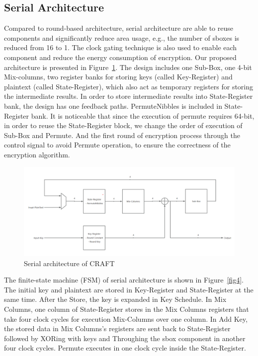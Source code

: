 \documentclass[sn-basic]{sn-jnl}%
\begin{document}
\subsection{Serial Architecture}\label{subsec2}
Compared to round-based architecture, serial architecture are able to reuse components and significantly reduce area usage, e.g., the number of sboxes is reduced from 16 to 1. The clock gating technique is also used to enable each component and reduce the energy consumption of encryption. Our proposed architecture is presented in Figure~\ref{fig3}. The design includes one Sub-Box, one 4-bit Mix-columns, two register banks for storing keys (called Key-Register) and plaintext (called State-Register), which also act as temporary registers for storing the intermediate results. In order to store intermediate results into State-Register bank, the design has one feedback paths. PermuteNibbles is included in State-Register bank. It is noticeable that since the execution of permute requires 64-bit, in order to reuse the State-Register block, we change the order of execution of Sub-Box and Permute. And the first round of encryption process through the control signal to avoid Permute operation, to ensure the correctness of the encryption algorithm.

\begin{figure}[h]%
    \caption{Serial architecture of CRAFT}\label{fig3}
    \centering
    \includegraphics[width=\textwidth]{serial_design.png}
\end{figure}

The finite-state machine (FSM) of serial architecture is shown in Figure~\ref{fig4}. The initial key and plaintext are stored in Key-Register and State-Register at the same time. After the Store, the key is expanded in Key Schedule. In Mix Columns, one column of State-Register stores in the Mix Columns registers that take four clock cycles for execution Mix-Columns over one column. In Add Key, the stored data in Mix Columns's registers are sent back to State-Register followed by XORing with keys and Throughing the sbox component in another four clock cycles. Permute executes in one clock cycle inside the State-Register.
\end{document}
